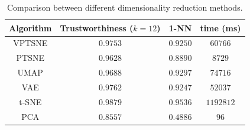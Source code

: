 \begin{table}[]
\centering
\caption{Comparison between different dimensionality reduction methods.}
\label{table:comparison}
\begin{tabular}{cccc}
Algorithm   & Trustworthiness ($k=12$)   & 1-NN     & time (ms) \\ \hline \hline
VPTSNE      & $0.9753$                   & $0.9250$ & $60766$   \\ \hline
PTSNE       & $0.9628$                   & $0.8890$ & $8729$    \\ \hline
UMAP        & $0.9688$                   & $0.9297$ & $74716$   \\ \hline
VAE         & $0.9762$                   & $0.9247$ & $52037$   \\ \hline
t-SNE       & $0.9879$                   & $0.9536$ & $1192812$ \\ \hline
PCA         & $0.8557$                   & $0.4886$ & $96$      \\ \hline
\end{tabular}
\end{table}


